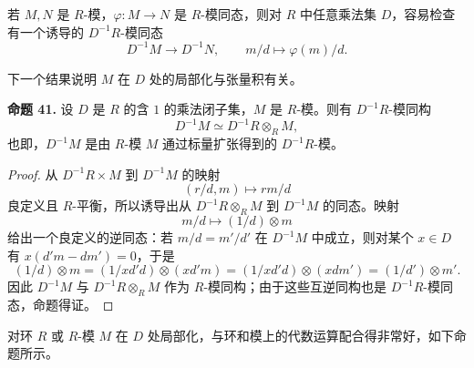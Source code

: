 若 $M,N$ 是 $R$-模，$\varphi:M\to N$ 是 $R$-模同态，则对 $R$ 中任意乘法集 $D$，容易检查有一个诱导的 $D^{-1}R$-模同态
\[
D^{-1}M\longrightarrow D^{-1}N,
\qquad
m/d\longmapsto \varphi(m)/d.
\]

下一个结果说明 $M$ 在 $D$ 处的局部化与张量积有关。

\noindent\textbf{命题 41.} 设 $D$ 是 $R$ 的含 $1$ 的乘法闭子集，$M$ 是 $R$-模。则有 $D^{-1}R$-模同构
\[
D^{-1}M\simeq D^{-1}R\otimes_R M,
\]
也即，$D^{-1}M$ 是由 $R$-模 $M$ 通过标量扩张得到的 $D^{-1}R$-模。

\begin{proof}
	从 $D^{-1}R\times M$ 到 $D^{-1}M$ 的映射
	\[
	(r/d,m)\longmapsto rm/d
	\]
	良定义且 $R$-平衡，所以诱导出从 $D^{-1}R\otimes_R M$ 到 $D^{-1}M$ 的同态。映射
	\[
	m/d\longmapsto (1/d)\otimes m
	\]
	给出一个良定义的逆同态：若 $m/d=m'/d'$ 在 $D^{-1}M$ 中成立，则对某个 $x\in D$ 有 $x(d'm-dm')=0$，于是
	\[
	(1/d)\otimes m=(1/xd'd)\otimes (xd'm)=(1/xd'd)\otimes (xdm')=(1/d')\otimes m'.
	\]
	因此 $D^{-1}M$ 与 $D^{-1}R\otimes_R M$ 作为 $R$-模同构；由于这些互逆同构也是 $D^{-1}R$-模同态，命题得证。
\end{proof}

对环 $R$ 或 $R$-模 $M$ 在 $D$ 处局部化，与环和模上的代数运算配合得非常好，如下命题所示。

